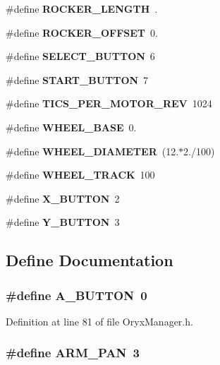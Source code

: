 \begin{DoxyCompactItemize}
\#define {\bf \-R\-O\-C\-K\-E\-R\-\_\-\-L\-E\-N\-G\-T\-H}~.
\item 
\#define {\bf \-R\-O\-C\-K\-E\-R\-\_\-\-O\-F\-F\-S\-E\-T}~0.
\item 
\#define {\bf \-S\-E\-L\-E\-C\-T\-\_\-\-B\-U\-T\-T\-O\-N}~6
\item 
\#define {\bf \-S\-T\-A\-R\-T\-\_\-\-B\-U\-T\-T\-O\-N}~7
\item 
\#define {\bf \-T\-I\-C\-S\-\_\-\-P\-E\-R\-\_\-\-M\-O\-T\-O\-R\-\_\-\-R\-E\-V}~1024
\item 
\#define {\bf \-W\-H\-E\-E\-L\-\_\-\-B\-A\-S\-E}~0.
\item 
\#define {\bf \-W\-H\-E\-E\-L\-\_\-\-D\-I\-A\-M\-E\-T\-E\-R}~(12.$\ast$2./100)
\item 
\#define {\bf \-W\-H\-E\-E\-L\-\_\-\-T\-R\-A\-C\-K}~100
\item 
\#define {\bf \-X\-\_\-\-B\-U\-T\-T\-O\-N}~2
\item 
\#define {\bf \-Y\-\_\-\-B\-U\-T\-T\-O\-N}~3
\end{DoxyCompactItemize}


\subsection{\-Define \-Documentation}
\subsubsection[{\-A\-\_\-\-B\-U\-T\-T\-O\-N}]{\setlength{\rightskip}{0pt plus 5cm}\#define {\bf \-A\-\_\-\-B\-U\-T\-T\-O\-N}~0}\label{OryxManager_8h_a5ec59d5e4f6bfacfdf3aa6e7ed5c0373}


\-Definition at line 81 of file \-Oryx\-Manager.\-h.

\subsubsection[{\-A\-R\-M\-\_\-\-P\-A\-N}]{\setlength{\rightskip}{0pt plus 5cm}\#define {\bf \-A\-R\-M\-\_\-\-P\-A\-N}~3}\label{OryxManager_8h_a4fdfc30293fa0f3364c1901776194826}


